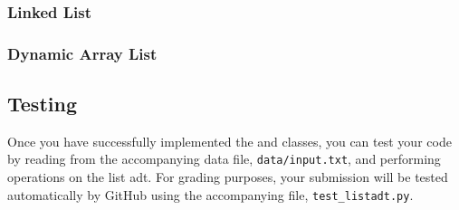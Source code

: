 \documentclass[addpoints]{exam}
\begin{document}

\subsubsection{Linked List}


\subsubsection{Dynamic Array List}




\subsection{Testing}
Once you have successfully implemented the  and  classes, you can test your code by reading from the accompanying data file, \texttt{data/input.txt}, and performing operations on the list adt. For grading purposes, your submission will be tested automatically by GitHub using the accompanying  file, \texttt{test\_listadt.py}.
\end{document}
